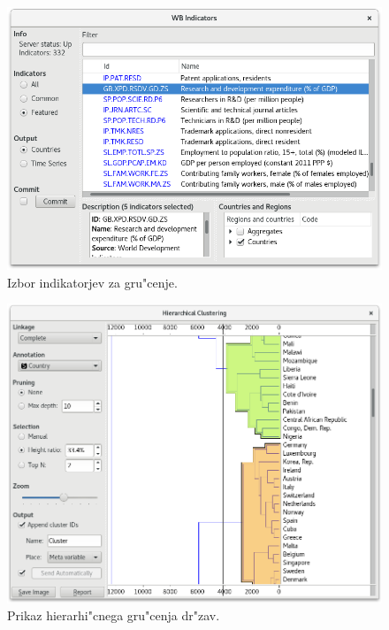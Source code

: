 \begin{figure}
\begin{center}
\includegraphics[width=12cm]{pic/clustering_indicator_selection.png}
\end{center}
\caption{Izbor indikatorjev za gru"cenje.}
\label{clustering_indicator_selection}
\end{figure} 

\begin{figure}
\begin{center}
\includegraphics[width=12cm]{pic/clustering_hierarchial_countries.png}
\end{center}
\caption{Prikaz hierarhi"cnega gru"cenja dr"zav.}
\label{clustering_hierarchial_countries}
\end{figure} 

